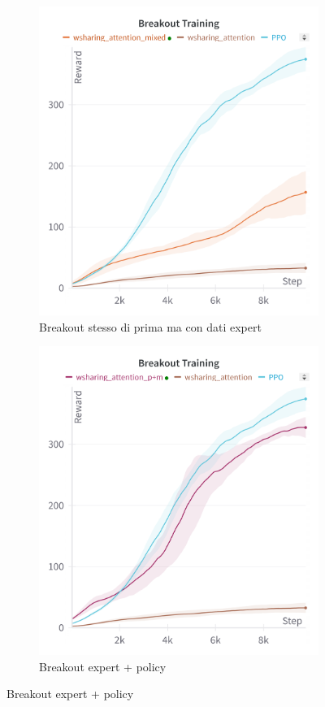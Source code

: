 \begin{figure}[htbp]
\begin{subfigure}[b]{0.32\textwidth}
        \includegraphics[width=\textwidth]{images/breakout_expert.png}
        \caption{Breakout stesso di prima ma con dati expert}
        \label{fig:breakout_expert_and_policy}
    \end{subfigure}
    \hfill
    \begin{subfigure}[b]{0.32\textwidth}
        \centering
        \includegraphics[width=\textwidth]{images/breakout_p+m.png}
        \caption{Breakout expert  + policy}
        \label{fig:breakout_expert_policy_skills}
    \end{subfigure}
    \hfill


\end{figure}
